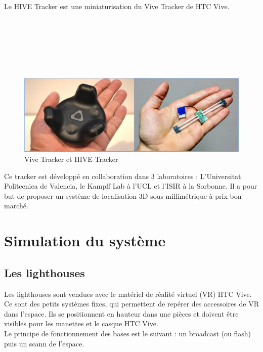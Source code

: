 \documentclass[10pt]{report}
\begin{document}
Le HIVE Tracker est une miniaturisation du Vive Tracker de HTC Vive.\\\\\\\\\\\\\\

\begin{figure}[h]
	\centering
	\includegraphics[scale=0.6]{Vivi_vs_HIVE.PNG}
	\caption{Vive Tracker et HIVE Tracker}
\end{figure}
	
Ce tracker est développé en collaboration dans 3 laboratoires : L'Universitat Politecnica de Valencia, le Kampff Lab à l'UCL et l'ISIR à la Sorbonne. Il a pour but de proposer un système de localisation 3D sous-millimétrique à prix bon marché.

\chapter{Simulation du système}

\section{Les lighthouses}

Les lighthouses sont vendues avec le matériel de réalité virtuel (VR) HTC Vive. Ce sont des petits systèmes fixes, qui permettent de repérer des accessoires de VR dans l'espace. Ils se positionnent en hauteur dans une pièces et doivent être visibles pour les manettes et le casque HTC Vive.\\

Le principe de fonctionnement des bases est le suivant : un broadcast (ou flash) puis un scann de l'espace.
\end{document}
